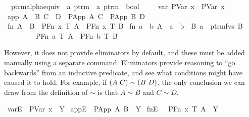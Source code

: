 \begin{implementation}
\isamarkupfalse%
\isanewline
\ \ ptrm{\isacharunderscore}alpha{\isacharunderscore}equiv\ {\isacharcolon}{\isacharcolon}\ {\isachardoublequoteopen}{\isacharprime}a\ ptrm\ {\isasymRightarrow}\ {\isacharprime}a\ ptrm\ {\isasymRightarrow}\ bool{\isachardoublequoteclose}\isanewline
\ \ \isanewline
\ \ var{\isacharcolon}\ {\isachardoublequoteopen}{\isacharparenleft}PVar\ x{\isacharparenright}\ {\isasymapprox}\ {\isacharparenleft}PVar\ x{\isacharparenright}{\isachardoublequoteclose}\isanewline
{\isacharbar}\ app{\isacharcolon}\ {\isachardoublequoteopen}{\isasymlbrakk}A\ {\isasymapprox}\ B{\isacharsemicolon}\ C\ {\isasymapprox}\ D{\isasymrbrakk}\ {\isasymLongrightarrow}\ {\isacharparenleft}PApp\ A\ C{\isacharparenright}\ {\isasymapprox}\ {\isacharparenleft}PApp\ B\ D{\isacharparenright}{\isachardoublequoteclose}\isanewline
{\isacharbar}\ fn{}{\isacharcolon}\ {\isachardoublequoteopen}A\ {\isasymapprox}\ B\ {\isasymLongrightarrow}\ {\isacharparenleft}PFn\ x\ T\ A{\isacharparenright}\ {\isasymapprox}\ {\isacharparenleft}PFn\ x\ T\ B{\isacharparenright}{\isachardoublequoteclose}\isanewline
{\isacharbar}\ fn{}{\isacharcolon}\ {\isachardoublequoteopen}{\isasymlbrakk}a\ {\isasymnoteq}\ b{\isacharsemicolon}\ A\ {\isasymapprox}\ {\isacharbrackleft}a\ {\isasymleftrightarrow}\ b{\isacharbrackright}\ {\isasymbullet}\ B{\isacharsemicolon}\ a\ {\isasymnotin}\ ptrm{\isacharunderscore}fvs\ B{\isasymrbrakk}\isanewline
\ \ \ \ \ \ \ \ {\isasymLongrightarrow}\ {\isacharparenleft}PFn\ a\ T\ A{\isacharparenright}\ {\isasymapprox}\ {\isacharparenleft}PFn\ b\ T\ B{\isacharparenright}{\isachardoublequoteclose}\isanewline
\end{implementation}

However, it does not provide eliminators by default, and these must be added manually using a separate command.
Eliminators provide reasoning to ``go backwards'' from an inductive predicate, and see what conditions might have caused it to hold.
For example, if \(\left(A\ C\right) \sim \left(B\ D\right)\), the only conclusion we can draw from the definition of \(\sim\) is that \(A \sim B\) and \(C \sim D\).

\begin{implementation}
\isamarkupfalse%
\ varE{\isacharcolon}\ \ {\isachardoublequoteopen}PVar\ x\ {\isasymapprox}\ Y{\isachardoublequoteclose}\isanewline
{}\isamarkupfalse%
\ appE{\isacharcolon}\ \ {\isachardoublequoteopen}PApp\ A\ B\ {\isasymapprox}\ Y{\isachardoublequoteclose}\isanewline
{}\isamarkupfalse%
\ fnE{\isacharcolon}\ \ \ {\isachardoublequoteopen}PFn\ x\ T\ A\ {\isasymapprox}\ Y{\isachardoublequoteclose}\isanewline
\end{implementation}

